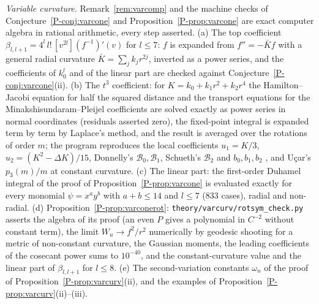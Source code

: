\documentclass[pdflatex,sn-mathphys-num]{sn-jnl}
\newcommand{\pref}[1]{\ref*{P-#1}}%
\theoremstyle{thmstyleone}%
\theoremstyle{thmstylethree}%
\begin{document}
\emph{Variable curvature.} Remark~\ref{rem:varcomp} and the machine checks of Conjecture~\pref{conj:varcone} and Proposition~\pref{prop:varcone} are exact computer algebra in rational arithmetic, every step asserted. (a) The top coefficient $\beta_{l,l+1}=4^l\,l!\,[v^{2l}](f^{-1})'(v)$ for $l\le7$: $f$ is expanded from $f''=-\bar Kf$ with a general radial curvature $\bar K=\sum_jk_jr^{2j}$, inverted as a power series, and the coefficients of $k_0^l$ and of the linear part are checked against Conjecture~\pref{conj:varcone}(ii). (b) The $t^3$ coefficient: for $K=k_0+k_1r^2+k_2r^4$ the Hamilton--Jacobi equation for half the squared distance and the transport equations for the Minakshisundaram--Pleijel coefficients are solved exactly as power series in normal coordinates (residuals asserted zero), the fixed-point integral is expanded term by term by Laplace's method, and the result is averaged over the rotations of order $m$; the program reproduces the local coefficients $u_1=K/3$, $u_2=(K^2-\Delta K)/15$, Donnelly's $\mathcal B_0,\mathcal B_1$, Schueth's $\mathcal B_2$ and $b_0,b_1,b_2$ \cite{schueth2019}, and U\c{c}ar's $p_3(m)/m$ at constant curvature. (c) The linear part: the first-order Duhamel integral of the proof of Proposition~\pref{prop:varcone} is evaluated exactly for every monomial $\psi=x^ay^b$ with $a+b\le14$ and $l\le7$ ($833$ cases), radial and non-radial. (d) Proposition~\pref{prop:varconerot}: \texttt{theory/varcurv/rotsym\_check.py} asserts the algebra of its proof (an even $P$ gives a polynomial in $C^{-2}$ without constant term), the limit $W_u\to f^2/r^2$ numerically by geodesic shooting for a metric of non-constant curvature, the Gaussian moments, the leading coefficients of the cosecant power sums to $10^{-40}$, and the constant-curvature value and the linear part of $\beta_{l,l+1}$ for $l\le8$. (e) The second-variation constants $\omega_n$ of the proof of Proposition~\pref{prop:varcurv}(ii), and the examples of Proposition~\pref{prop:varcurv}(ii)--(iii).
\end{document}
